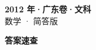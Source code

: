 \documentclass[zihao=-4, a4paper]{ctexart}
\begin{document}
\begin{center}
  {\Large\bfseries 2012 年·广东卷·文科}\\[4pt]
  {\large 数学 · 简答版}
\end{center}
\medskip
{}

\clearpage
{}
\begin{center}{\Large\bfseries 答案速查}\end{center}
\medskip

\end{document}
